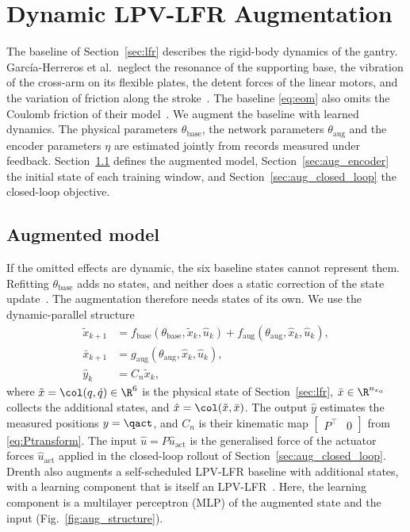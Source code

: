 \section{Dynamic LPV-LFR Augmentation}\label{sec:augmentation}

The baseline of Section~\ref{sec:lfr} describes the rigid-body dynamics of
the gantry.
Garc\'ia-Herreros et al.\ neglect the resonance of the supporting base, the
vibration of the cross-arm on its flexible plates, the detent forces of the
linear motors, and the variation of friction along the
stroke~\cite[Sec.~2.4]{garcia2013model}.
The baseline \eqref{eq:eom} also omits the Coulomb friction of their
model~\cite{garcia2013model}.
We augment the baseline with learned dynamics.
The physical parameters $\theta_{\mathrm{base}}$, the network parameters
$\theta_{\mathrm{aug}}$ and the encoder parameters $\eta$ are estimated
jointly from records measured under feedback.
Section~\ref{sec:aug_structure} defines the augmented model,
Section~\ref{sec:aug_encoder} the initial state of each training window, and
Section~\ref{sec:aug_closed_loop} the closed-loop objective.

\subsection{Augmented model}\label{sec:aug_structure}
If the omitted effects are dynamic, the six baseline states cannot represent
them.
Refitting $\theta_{\mathrm{base}}$ adds no states, and neither does a static
correction of the state update~\cite[Sec.~2]{hoekstra2025lfr}.
The augmentation therefore needs states of its own.
We use the dynamic-parallel structure~\cite[Table~1]{hoekstra2026lfr}
\begin{equation}
\begin{aligned}
 \tilde x_{k+1}
 &=f_{\mathrm{base}}(\theta_{\mathrm{base}},\tilde x_k,\hat u_k)
   +f_{\mathrm{aug}}(\theta_{\mathrm{aug}},\hat x_k,\hat u_k),\\
 \bar x_{k+1}
 &=g_{\mathrm{aug}}(\theta_{\mathrm{aug}},\hat x_k,\hat u_k),\\
 \hat y_k&=C_n\tilde x_k ,
\end{aligned}
\label{eq:aug_transition}
\end{equation}
where $\tilde x=\col(q,\dot q)\in\R^6$ is the physical state of
Section~\ref{sec:lfr}, $\bar x\in\R^{n_{x_a}}$ collects the additional
states, and $\hat x=\col(\tilde x,\bar x)$.
The output $\hat y$ estimates the measured positions $y=\qact$, and $C_n$ is
their kinematic map $\begin{bmatrix}P^\top & 0\end{bmatrix}$ from
\eqref{eq:Ptransform}.
The input $\hat u=P\hat u_{\mathrm{act}}$ is the generalised force of the
actuator forces $\hat u_{\mathrm{act}}$ applied in the closed-loop rollout of
Section~\ref{sec:aug_closed_loop}.
Drenth also augments a self-scheduled LPV-LFR baseline with additional
states, with a learning component that is itself an
LPV-LFR~\cite[Sec.~5.2]{drenth2025thesis}.
Here, the learning component is a multilayer perceptron (MLP) of the
augmented state and the input (Fig.~\ref{fig:aug_structure}).

